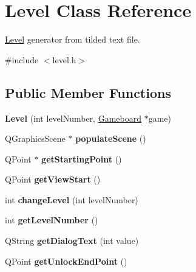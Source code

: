\hypertarget{class_level}{}\section{Level Class Reference}
\label{class_level}


\hyperlink{class_level}{Level} generator from tilded text file.  




{\ttfamily \#include $<$level.\+h$>$}

\subsection*{Public Member Functions}
\begin{DoxyCompactItemize}
\item 
\hypertarget{class_level_a88a7dfc5743b8beda252398ab1676f39}{}{\bfseries Level} (int level\+Number, \hyperlink{class_gameboard}{Gameboard} $\ast$game)\label{class_level_a88a7dfc5743b8beda252398ab1676f39}

\item 
\hypertarget{class_level_a898937cdec40914b45ecb23649cd5e2a}{}Q\+Graphics\+Scene $\ast$ {\bfseries populate\+Scene} ()\label{class_level_a898937cdec40914b45ecb23649cd5e2a}

\item 
\hypertarget{class_level_ae7176d05829097956f8ba57fcd4155dc}{}Q\+Point $\ast$ {\bfseries get\+Starting\+Point} ()\label{class_level_ae7176d05829097956f8ba57fcd4155dc}

\item 
\hypertarget{class_level_aa1d6d7b228f5b64d697c0cd3666ea836}{}Q\+Point {\bfseries get\+View\+Start} ()\label{class_level_aa1d6d7b228f5b64d697c0cd3666ea836}

\item 
\hypertarget{class_level_a1a34f3b2d48e3b1e11b864108cd08ddf}{}int {\bfseries change\+Level} (int level\+Number)\label{class_level_a1a34f3b2d48e3b1e11b864108cd08ddf}

\item 
\hypertarget{class_level_afbf573a6aecae9cba02d7398e5637dd5}{}int {\bfseries get\+Level\+Number} ()\label{class_level_afbf573a6aecae9cba02d7398e5637dd5}

\item 
\hypertarget{class_level_a88af9e3a9a86d7692f665fe6d781ec17}{}Q\+String {\bfseries get\+Dialog\+Text} (int value)\label{class_level_a88af9e3a9a86d7692f665fe6d781ec17}

\item 
\hypertarget{class_level_a25c74d7cf455e332d9aca192136b0c1b}{}Q\+Point {\bfseries get\+Unlock\+End\+Point} ()\label{class_level_a25c74d7cf455e332d9aca192136b0c1b}

\end{DoxyCompactItemize}


